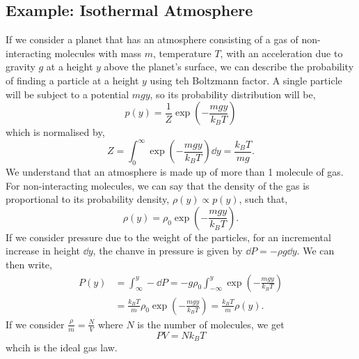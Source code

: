 \documentclass{book}
\begin{document}
\subsection{Example: Isothermal Atmosphere}
If we consider a planet that has an atmosphere consisting of a gas of non-interacting molecules with mass $m$, temperature $T$, with an acceleration due to gravity $g$ at a height $y$ above the planet's surface, we can describe the probability of finding a particle at a height $y$ using teh Boltzmann factor. A single particle will be subject to a potential $mgy$, so its probability distribution will be,
\begin{equation}
	p(y) = \frac{1}{Z} \exp \left(-\frac{mgy}{k_BT}\right)
\end{equation}
which is normalised by,
\begin{equation}
	Z = \int_0^\infty \exp\left(-\frac{mgy}{k_BT}\right) \dd{y} = \frac{k_BT}{mg}.
\end{equation}
We understand that an atmosphere is made up of more than 1 molecule of gas. For non-interacting molecules, we can say that the density of the gas is proportional to its probability density, $\rho(y) \propto p(y)$, such that,
\begin{equation}
	\rho(y) = \rho_0 \exp \left(-\frac{mgy}{k_BT}\right).
\end{equation}
If we consider pressure due to the weight of the particles, for an incremental increase in height $\dd{y}$, the chanve in pressure is given by $\dd{P} = - \rho g \dd{y}$. We can then write,
\begin{equation}
	\begin{split}
		P(y) & = \int_{\infty}^{y}-\dd{P} = -g\rho_0 \int_{-\infty}^{y}\exp\left(-\frac{mgy}{k_BT}\right) \\
		& = \frac{k_BT}{m}\rho_0 \exp\left(-\frac{mgy}{k_BT}\right)  = \frac{k_BT}{m}\rho(y).
	\end{split}
\end{equation}
If we consider $\frac{\rho}{m} = \frac{N}{V}$ where $N$ is the number of molecules, we get
\begin{equation}
	PV = Nk_BT
\end{equation}
whcih is the ideal gas law.
\end{document}
